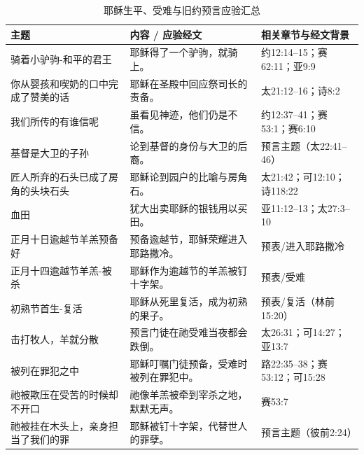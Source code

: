 \begin{table}[htbp]
\centering
\caption{耶稣生平、受难与旧约预言应验汇总}
\small %
\begin{tabular}{|p{3.3cm}|p{4.5cm}|p{4.6cm}|}\hline
\textbf{主题} & \textbf{内容 / 应验经文} & \textbf{相关章节与经文背景} \\\hline

骑着小驴驹-和平的君王 & 耶稣得了一个驴驹，就骑上。 & 约12:14--15；赛62:11；亚9:9 \\\hline

你从婴孩和喫奶的口中完成了赞美的话 & 耶稣在圣殿中回应祭司长的责备。 & 太21:12--16；诗8:2 \\\hline

我们所传的有谁信呢 & 虽看见神迹，他们仍是不信。 & 约12:37--41；赛53:1；赛6:10 \\\hline

基督是大卫的子孙 & 论到基督的身份与大卫的后裔。 & 预言主题（太22:41--46） \\\hline

匠人所弃的石头已成了房角的头块石头 & 耶稣论到园户的比喻与房角石。 & 太21:42；可12:10；诗118:22 \\\hline

血田 & 犹大出卖耶稣的银钱用以买田。 & 亚11:12--13；太27:3--10 \\\hline

正月十日逾越节羊羔预备好 & 预备逾越节，耶稣荣耀进入耶路撒冷。 & 预表/进入耶路撒冷 \\\hline

正月十四逾越节羊羔-被杀 & 耶稣作为逾越节的羊羔被钉十字架。 & 预表/受难 \\\hline

初熟节首生-复活 & 耶稣从死里复活，成为初熟的果子。 & 预表/复活（林前15:20） \\\hline

击打牧人，羊就分散 & 预言门徒在祂受难当夜都会跌倒。 & 太26:31；可14:27；亚13:7 \\\hline

被列在罪犯之中 & 耶稣叮嘱门徒预备，受难时被列在罪犯中。 & 路22:35--38；赛53:12；可15:28 \\\hline

祂被欺压在受苦的时候却不开口 & 祂像羊羔被牵到宰杀之地，默默无声。 & 赛53:7 \\\hline

祂被挂在木头上，亲身担当了我们的罪 & 耶稣被钉十字架，代替世人的罪孽。 & 预言主题（彼前2:24） \\\hline


\end{tabular}
\end{table}
